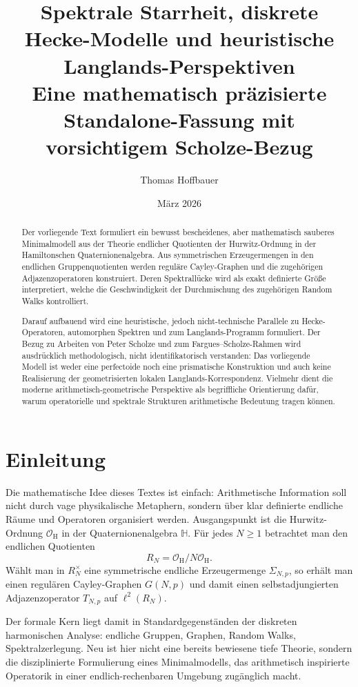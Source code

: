 \documentclass[12pt,a4paper]{article}
\title{\textbf{Spektrale Starrheit, diskrete Hecke-Modelle und heuristische Langlands-Perspektiven}\\
\large Eine mathematisch präzisierte Standalone-Fassung mit vorsichtigem Scholze-Bezug}
\author{Thomas Hoffbauer}
\date{März 2026}
\theoremstyle{plain}
\theoremstyle{definition}
\theoremstyle{remark}
\newcommand{\HH}{\mathbb{H}}
\newcommand{\OH}{\mathcal{O}_{\mathrm H}}
\newcommand{\RN}{R_N}
\newcommand{\SNp}{\Sigma_{N,p}}
\newcommand{\GNp}{G(N,p)}
\newcommand{\TNp}{T_{N,p}}
\begin{document}
\maketitle

\begin{abstract}
Der vorliegende Text formuliert ein bewusst bescheidenes, aber mathematisch sauberes Minimalmodell aus der Theorie endlicher Quotienten der Hurwitz-Ordnung in der Hamiltonschen Quaternionenalgebra. Aus symmetrischen Erzeugermengen in den endlichen Gruppenquotienten werden reguläre Cayley-Graphen und die zugehörigen Adjazenzoperatoren konstruiert. Deren Spektrallücke wird als exakt definierte Größe interpretiert, welche die Geschwindigkeit der Durchmischung des zugehörigen Random Walks kontrolliert.

Darauf aufbauend wird eine heuristische, jedoch nicht-technische Parallele zu Hecke-Operatoren, automorphen Spektren und zum Langlands-Programm formuliert. Der Bezug zu Arbeiten von Peter Scholze und zum Fargues--Scholze-Rahmen wird ausdrücklich methodologisch, nicht identifikatorisch verstanden: Das vorliegende Modell ist weder eine perfectoide noch eine prismatische Konstruktion und auch keine Realisierung der geometrisierten lokalen Langlands-Korrespondenz. Vielmehr dient die moderne arithmetisch-geometrische Perspektive als begriffliche Orientierung dafür, warum operatorielle und spektrale Strukturen arithmetische Bedeutung tragen können.
\end{abstract}

\section{Einleitung}
Die mathematische Idee dieses Textes ist einfach: Arithmetische Information soll nicht durch vage physikalische Metaphern, sondern über klar definierte endliche Räume und Operatoren organisiert werden. Ausgangspunkt ist die Hurwitz-Ordnung \(\OH\) in der Quaternionenalgebra \(\HH\). Für jedes \(N\geq 1\) betrachtet man den endlichen Quotienten
\[
\RN = \OH/N\OH.
\]
Wählt man in \(\RN^\times\) eine symmetrische endliche Erzeugermenge \(\SNp\), so erhält man einen regulären Cayley-Graphen \(\GNp\) und damit einen selbstadjungierten Adjazenzoperator \(\TNp\) auf \(\ell^2(\RN)\).

Der formale Kern liegt damit in Standardgegenständen der diskreten harmonischen Analyse: endliche Gruppen, Graphen, Random Walks, Spektralzerlegung. Neu ist hier nicht eine bereits bewiesene tiefe Theorie, sondern die disziplinierte Formulierung eines Minimalmodells, das arithmetisch inspirierte Operatorik in einer endlich-rechenbaren Umgebung zugänglich macht.
\end{document}
